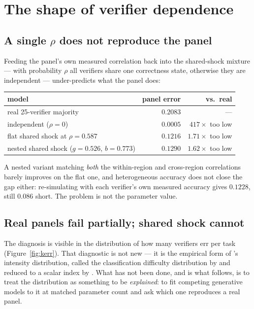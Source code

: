 \documentclass[11pt,a4paper]{article}
\begin{document}
\section{The shape of verifier dependence}
\label{sec:shape}

\subsection{A single $\rho$ does not reproduce the panel}

Feeding the panel's own measured correlation back into the shared-shock mixture
--- with probability $\rho$ all verifiers share one correctness state, otherwise
they are independent --- under-predicts what the panel does:

\begin{center}
\begin{tabular}{lrr}
\toprule
model & panel error & vs.\ real \\
\midrule
real 25-verifier majority        & $0.2083$ & --- \\
independent ($\rho = 0$)         & $0.0005$ & $417\times$ too low \\
flat shared shock at $\rho=0.587$ & $0.1216$ & $1.71\times$ too low \\
nested shared shock ($g=0.526$, $b=0.773$) & $0.1290$ & $1.62\times$ too low \\
\bottomrule
\end{tabular}
\end{center}

A nested variant matching \emph{both} the within-region and cross-region
correlations barely improves on the flat one, and heterogeneous accuracy does not
close the gap either: re-simulating with each verifier's own measured accuracy
gives $0.1228$, still $0.086$ short. The problem is not the parameter value.

\subsection{Real panels fail partially; shared shock cannot}

The diagnosis is visible in the distribution of how many verifiers err per task
(Figure~\ref{fig:kerr}). That diagnostic is not new --- it is the empirical form
of \citet{eckhardt1985}'s intensity distribution, called the classification
difficulty distribution by \citet{hansen1990} and reduced to a scalar index by
\citet{kuncheva2003}. What has not been done, and is what
follows, is to treat the distribution as something to be \emph{explained}: to fit
competing generative models to it at matched parameter count and ask which one
reproduces a real panel.
\end{document}
